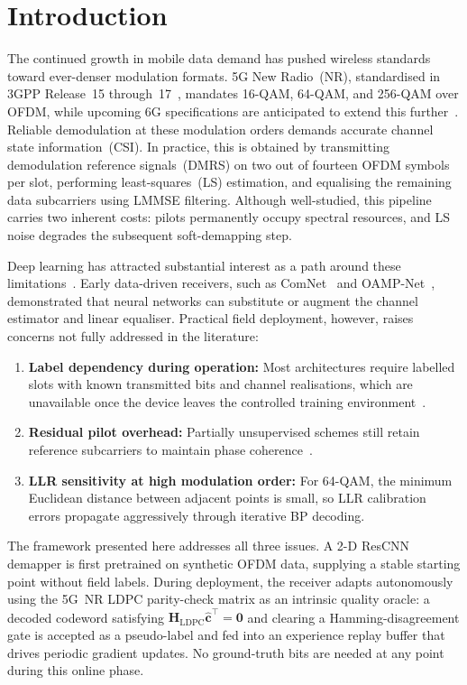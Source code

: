\documentclass{ieeeaccess}
\begin{document}
\section{Introduction}\label{sec:intro}

The continued growth in mobile data demand has pushed wireless standards toward
ever-denser modulation formats. 5G New Radio~(NR), standardised in 3GPP Release~15
through~17~\cite{3gpp38211}, mandates 16-QAM, 64-QAM, and 256-QAM over OFDM, while
upcoming 6G specifications are anticipated to extend this further~\cite{wang2026}.
Reliable demodulation at these modulation orders demands accurate channel state
information~(CSI). In practice, this is obtained by transmitting demodulation reference
signals~(DMRS) on two out of fourteen OFDM symbols per slot, performing least-squares~(LS)
estimation, and equalising the remaining data subcarriers using LMMSE filtering. Although
well-studied, this pipeline carries two inherent costs: pilots permanently occupy spectral
resources, and LS noise degrades the subsequent soft-demapping step.

Deep learning has attracted substantial interest as a path around these
limitations~\cite{oshea2017,ye2018,he2019,honkala2021,hoydis2022}. Early data-driven
receivers, such as ComNet~\cite{ye2018} and OAMP-Net~\cite{he2019}, demonstrated that
neural networks can substitute or augment the channel estimator and linear equaliser.
Practical field deployment, however, raises concerns not fully addressed in the literature:

\begin{enumerate}
  \item \textbf{Label dependency during operation:} Most architectures require labelled
    slots with known transmitted bits and channel realisations, which are unavailable
    once the device leaves the controlled training environment~\cite{pratik2024}.
  \item \textbf{Residual pilot overhead:} Partially unsupervised schemes still retain
    reference subcarriers to maintain phase coherence~\cite{zhang2023,wu2024}.
  \item \textbf{LLR sensitivity at high modulation order:} For 64-QAM, the minimum
    Euclidean distance between adjacent points is small, so LLR calibration errors
    propagate aggressively through iterative BP decoding.
\end{enumerate}

The framework presented here addresses all three issues. A 2-D ResCNN demapper is first
pretrained on synthetic OFDM data, supplying a stable starting point without field labels.
During deployment, the receiver adapts autonomously using the 5G~NR LDPC parity-check
matrix as an intrinsic quality oracle: a decoded codeword satisfying
$\mathbf{H}_{\mathrm{LDPC}}\hat{\mathbf{c}}^{\top}=\mathbf{0}$ and clearing a
Hamming-disagreement gate is accepted as a pseudo-label and fed into an experience replay
buffer that drives periodic gradient updates. No ground-truth bits are needed at any
point during this online phase.
\end{document}
